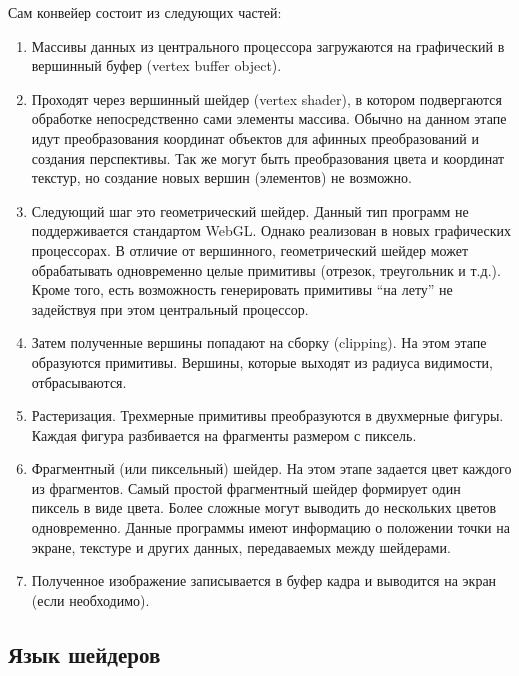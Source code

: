 Сам конвейер состоит из следующих частей:

\begin{enumerate}
  \item Массивы данных из центрального процессора загружаются на графический в вершинный буфер
    (vertex buffer object).

  \item Проходят через вершинный шейдер (vertex shader), в котором подвергаются обработке 
    непосредственно сами элементы массива. Обычно на данном этапе идут преобразования 
    координат объектов для афинных преобразований и создания перспективы. Так же 
    могут быть преобразования цвета и координат текстур, но создание новых вершин 
    (элементов) не возможно.

  \item Следующий шаг это геометрический шейдер. Данный тип программ не поддерживается
    стандартом WebGL. Однако реализован в новых графических процессорах. В отличие 
    от вершинного, геометрический шейдер может обрабатывать одновременно целые примитивы 
    (отрезок, треугольник и т.д.). Кроме того, есть возможность генерировать примитивы 
    ``на лету'' не задействуя при этом центральный процессор.

  \item Затем полученные вершины попадают на сборку (clipping). На этом этапе образуются
    примитивы. Вершины, которые выходят из радиуса видимости, отбрасываются.

  \item Растеризация. Трехмерные примитивы преобразуются в двухмерные фигуры. Каждая фигура
    разбивается на фрагменты размером с пиксель.

  \item Фрагментный (или пиксельный) шейдер. На этом этапе задается цвет каждого из фрагментов.
    Самый простой фрагментный шейдер формирует один пиксель в виде цвета. Более сложные могут 
    выводить до нескольких цветов одновременно. Данные программы имеют информацию о положении 
    точки на экране, текстуре и других данных, передаваемых между шейдерами.

  \item Полученное изображение записывается в буфер кадра и выводится на экран (если необходимо).
\end{enumerate}

\subsection{Язык шейдеров}

